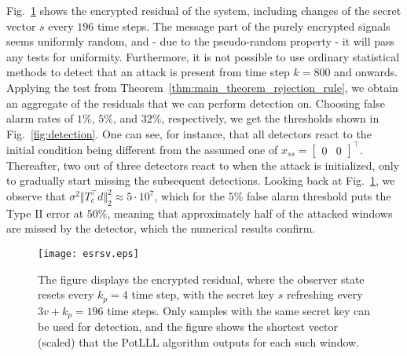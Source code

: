 \documentclass[journal, twoside, web]{ieeecolorpreprint}
\begin{document}
Fig.~\ref{fig:esrsv} shows the encrypted residual of the system, including changes of the secret vector $s$ every $196$ time steps. The message part of the purely encrypted signals seems uniformly random, and - due to the pseudo-random property - it will pass any tests for uniformity. Furthermore, it is not possible to use ordinary statistical methods to detect that an attack is present from time step $k=800$ and onwards. Applying the test from Theorem~\ref{thm:main_theorem_rejection_rule}, we obtain an aggregate of the residuals that we can perform detection on. Choosing false alarm rates of $1\%$, $5\%$, and $32\%$, respectively, we get the thresholds shown in Fig.~\ref{fig:detection}. One can see, for instance, that all detectors react to the initial condition being different from the assumed one of $x_{ss} = \begin{bmatrix}
    0 & 0
\end{bmatrix}^\top$. Thereafter, two out of three detectors react to when the attack is initialized, only to gradually start missing the subsequent detections. Looking back at Fig.~\ref{fig:esrsv}, we observe that $\sigma^2\Vert T_c^\top d \Vert_2^2 \approx 5 \cdot 10^7$, which for the $5\%$ false alarm threshold puts the Type II error at $50\%$, meaning that approximately half of the attacked windows are missed by the detector, which the numerical results confirm.

\begin{figure}
    \centering
    \texttt{[image: esrsv.eps]}
    \caption{The figure displays the encrypted residual, where the observer state resets every $k_p=4$ time step, with the secret key $s$ refreshing every $3v+k_p=196$ time steps. Only samples with the same secret key can be used for detection, and the figure shows the shortest vector (scaled) that the PotLLL algorithm outputs for each such window.}
    \label{fig:esrsv}
\end{figure}

\end{document}
